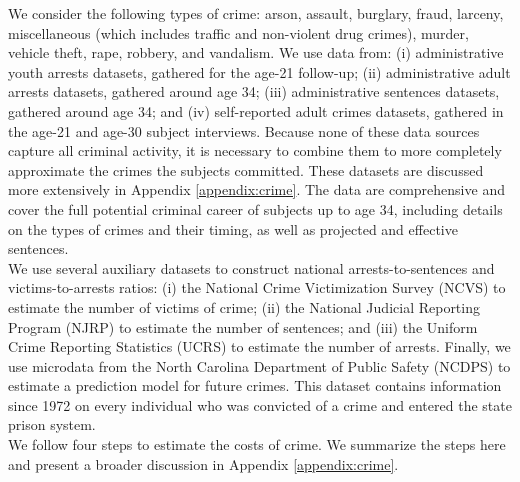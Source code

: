 \noindent We consider the following types of crime: arson, assault, burglary, fraud, larceny, miscellaneous (which includes traffic and non-violent drug crimes), murder, vehicle theft, rape, robbery, and vandalism. We use data from: (i) administrative youth arrests datasets, gathered for the age-21 follow-up; (ii) administrative adult arrests datasets, gathered around age 34; (iii) administrative sentences datasets, gathered around age 34; and (iv) self-reported adult crimes datasets, gathered in the age-21 and age-30 subject interviews. Because none of these data sources capture all criminal activity, it is necessary to combine them to more completely approximate the crimes the subjects committed. These datasets are discussed more extensively in Appendix \ref{appendix:crime}. The data are comprehensive and cover the full potential criminal career of subjects up to age 34, including details on the types of crimes and their timing, as well as projected and effective sentences. \\

\noindent We use several auxiliary datasets to construct national arrests-to-sentences and victims-to-arrests ratios: (i) the National Crime Victimization Survey (NCVS) to estimate the number of victims of crime; (ii) the National Judicial Reporting Program (NJRP) to estimate the number of sentences; and (iii) the Uniform Crime Reporting Statistics (UCRS) to estimate the number of arrests. Finally, we use microdata from the North Carolina Department of Public Safety (NCDPS) to estimate a prediction model for future crimes. This dataset contains information since 1972 on every individual who was convicted of a crime and entered the state prison system. \\

\noindent We follow four steps to estimate the costs of crime. We summarize the steps here and present a broader discussion in
Appendix \ref{appendix:crime}. \\

